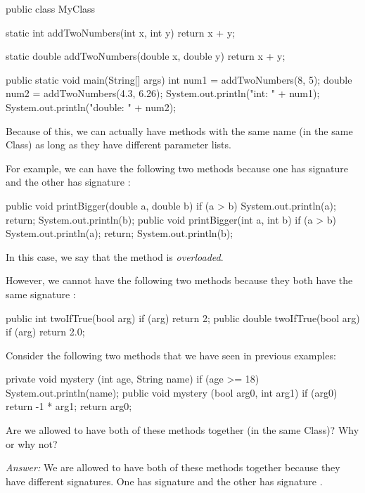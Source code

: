 \begin{code}
public class MyClass{
  static int addTwoNumbers(int x, int y) {
    return x + y;
  }

  static double addTwoNumbers(double x, double y) {
    return x + y;
  }

  public static void main(String[] args) {
    int num1 = addTwoNumbers(8, 5);
    double num2 = addTwoNumbers(4.3, 6.26);
    System.out.println("int: " + num1);
    System.out.println("double: " + num2);
  }
}
\end{code}



Because of this, we can actually have methods with the same name (in the same
Class) as long as they have different parameter lists.

For example, we can have the following two methods because
one has signature  and the other
has signature :
\begin{code}
public void printBigger(double a, double b) {
  if (a > b) {
    System.out.println(a);
    return;
  }
  System.out.println(b);
}
public void printBigger(int a, int b) {
  if (a > b) {
    System.out.println(a);
    return;
  }
  System.out.println(b);
}
\end{code}
In this case, we say that the  method is \emph{overloaded}.

However, we cannot have the following two methods because they both have the
same signature :
\begin{code}
public int twoIfTrue(bool arg) {
  if (arg) {
    return 2;
  }
}
public double twoIfTrue(bool arg) {
  if (arg) {
    return 2.0;
  }
}
\end{code}

\begin{example}
Consider the following two methods that we have seen in previous
examples:
\begin{code}
private void mystery (int age, String name) {
  if (age >= 18) {
    System.out.println(name);
  }
}
public void mystery (bool arg0, int arg1) {
  if (arg0) {
    return -1 * arg1;
  }
  return arg0;
}
\end{code}
Are we allowed to have both of these methods together (in the same Class)?
Why or why not?

\noindent \emph{Answer:}
We are allowed to have both of these methods together because they have
different signatures. One has signature 
and the other has signature .
\end{example}

